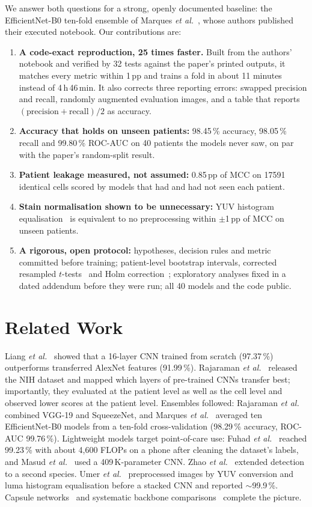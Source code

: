 \documentclass[conference]{IEEEtran}
\begin{document}
We answer both questions for a strong, openly documented baseline: the EfficientNet-B0 ten-fold ensemble of Marques \emph{et al.}~\cite{marques2022}, whose authors published their executed notebook. Our contributions are:
\begin{enumerate}
\item \textbf{A code-exact reproduction, 25 times faster.} Built from the authors' notebook and verified by 32 tests against the paper's printed outputs, it matches every metric within 1\,pp and trains a fold in about 11 minutes instead of 4\,h\,46\,min. It also corrects three reporting errors: swapped precision and recall, randomly augmented evaluation images, and a table that reports $(\text{precision}+\text{recall})/2$ as accuracy.
\item \textbf{Accuracy that holds on unseen patients:} 98.45\,\% accuracy, 98.05\,\% recall and 99.80\,\% ROC-AUC on 40 patients the models never saw, on par with the paper's random-split result.
\item \textbf{Patient leakage measured, not assumed:} 0.85\,pp of MCC on \num{17591} identical cells scored by models that had and had not seen each patient.
\item \textbf{Stain normalisation shown to be unnecessary:} YUV histogram equalisation~\cite{umer2020} is equivalent to no preprocessing within $\pm$1\,pp of MCC on unseen patients.
\item \textbf{A rigorous, open protocol:} hypotheses, decision rules and metric committed before training; patient-level bootstrap intervals, corrected resampled $t$-tests~\cite{nadeau2003} and Holm correction~\cite{holm1979}; exploratory analyses fixed in a dated addendum before they were run; all 40 models and the code public.
\end{enumerate}

\section{Related Work}
Liang \emph{et al.}~\cite{liang2016} showed that a 16-layer CNN trained from scratch (97.37\,\%) outperforms transferred AlexNet features (91.99\,\%). Rajaraman \emph{et al.}~\cite{rajaraman2018} released the NIH dataset and mapped which layers of pre-trained CNNs transfer best; importantly, they evaluated at the patient level as well as the cell level and observed lower scores at the patient level. Ensembles followed: Rajaraman \emph{et al.}~\cite{rajaraman2019} combined VGG-19 and SqueezeNet, and Marques \emph{et al.}~\cite{marques2022} averaged ten EfficientNet-B0 models from a ten-fold cross-validation (98.29\,\% accuracy, ROC-AUC 99.76\,\%). Lightweight models target point-of-care use: Fuhad \emph{et al.}~\cite{fuhad2020} reached 99.23\,\% with about 4{,}600 FLOPs on a phone after cleaning the dataset's labels, and Masud \emph{et al.}~\cite{masud2020} used a 409\,K-parameter CNN. Zhao \emph{et al.}~\cite{zhao2020} extended detection to a second species. Umer \emph{et al.}~\cite{umer2020} preprocessed images by YUV conversion and luma histogram equalisation before a stacked CNN and reported $\sim$99.9\,\%. Capsule networks~\cite{madhu2023} and systematic backbone comparisons~\cite{hemachandran2023,mujahid2024} complete the picture.
\end{document}
